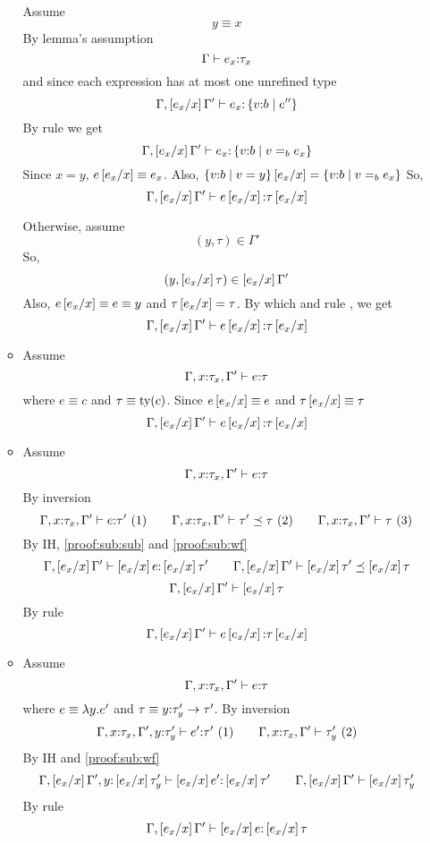 \begin{enumerate}
\begin{itemize}
Assume
$$y \equiv x$$
By lemma's assumption 
$$\hastype{\Gamma}{e_x}{\tau_x}$$
and since each expression has at most one unrefined type
$$\hastype{\Gamma,\sub{x}{e_x}\Gamma'}{e_x}{\tref{v}{b}{e''}}$$
By rule \rtexact we get
$$\hastype{\Gamma,\sub{x}{e_x}\Gamma'}{e_x}{\tref{v}{b}{v \eqb{b} e_x}}$$
Since $x = y$, $e\sub{x}{e_x} \equiv e_x$.
Also, $\tref{v}{b}{v=y}\sub{x}{e_x}=\tref{v}{b}{v \eqb{b} e_x}$ 
So,
$$\hastype{\Gamma,\sub{x}{e_x}\Gamma'}{e\sub{x}{e_x}}{\tau\sub{x}{e_x}}$$

Otherwise, assume
$$(y,\tau)\in \Gamma'$$
So,
$$(y,\sub{x}{e_x}\tau)\in \sub{x}{e_x}\Gamma'$$
Also, $e\sub{x}{e_x}\equiv e \equiv y$ and $\tau\sub{x}{e_x} =\tau$.
By which and rule \rtvar, we get
$$\hastype{\Gamma,\sub{x}{e_x}\Gamma'}{e\sub{x}{e_x}}{\tau\sub{x}{e_x}}$$

\item\rtconst
Assume 
	$$\hastype{\Gamma, x\colon\tau_x, \Gamma'}{e}{\tau}$$
where $e \equiv c$ and $\tau\equiv\ty{c}$.
Since $e\sub{x}{e_x} \equiv e$ and $\tau\sub{x}{e_x}\equiv\tau$
$$\hastype{\Gamma,\sub{x}{e_x}\Gamma'}{e\sub{x}{e_x}}{\tau\sub{x}{e_x}}$$

\item\rtsub
Assume 
	$$\hastype{\Gamma, x\colon\tau_x, \Gamma'}{e}{\tau}$$
By inversion
$$
\hastype{\Gamma, x\colon\tau_x, \Gamma'}{e}{\tau'}\ (1)\qquad
\issubtype{\Gamma, x\colon\tau_x, \Gamma'}{\tau'}{\tau} \ (2)\qquad
\iswellformed{\Gamma, x\colon\tau_x, \Gamma'}{\tau} \ (3)
$$
By IH, \ref{proof:sub:sub} and \ref{proof:sub:wf}
$$
\hastype{\Gamma, \sub{x}{e_x}\Gamma'}{\sub{x}{e_x}e}{\sub{x}{e_x}\tau'}\qquad
\issubtype{\Gamma, \sub{x}{e_x}\Gamma'}{\sub{x}{e_x}\tau'}{\sub{x}{e_x}\tau}
$$
$$
\iswellformed{\Gamma, \sub{x}{e_x}\Gamma'}{\sub{x}{e_x}\tau}
$$
By rule \rtsub
$$\hastype{\Gamma,\sub{x}{e_x}\Gamma'}{e\sub{x}{e_x}}{\tau\sub{x}{e_x}}$$
\item\rtfun
Assume
	$$\hastype{\Gamma, x\colon\tau_x, \Gamma'}{e}{\tau}$$
where $e\equiv\efun{y}{e'}$ and $\tau\equiv\tfun{y}{\tau'_y}{\tau'}$.
By inversion
	$$
	\hastype{\Gamma, x\colon\tau_x, \Gamma', y\colon\tau'_y}{e'}{\tau'}\ (1)\qquad
	\iswellformed{\Gamma, x\colon\tau_x, \Gamma'}{\tau'_y}\ (2)
	$$
By IH and \ref{proof:sub:wf}
	$$
	\hastype{\Gamma,\sub{x}{e_x} \Gamma', y\colon\sub{x}{e_x}\tau'_y}{\sub{x}{e_x}e'}{\sub{x}{e_x}\tau'} \qquad
	\iswellformed{\Gamma, \sub{x}{e_x}\Gamma'}{\sub{x}{e_x}\tau'_y}
	$$
	By rule \rtfun
	$$
	\hastype{\Gamma,\sub{x}{e_x} \Gamma'}{\sub{x}{e_x}e}{\sub{x}{e_x}\tau}
	$$
	

\end{itemize}
\end{enumerate}

